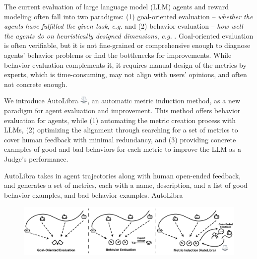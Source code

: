 \documentclass{article} %
\begin{document}
The current evaluation of large language model (LLM) agents and reward modeling often fall
into two paradigms: (1) goal-oriented evaluation --
\emph{whether the agents have fulfilled the given task},
\emph{e.g.} \citet{zhouwebarena,jimenezswe,chan2024mle,paglieri2024balrog}
and (2) behavior evaluation -- \emph{how well the agents do on heuristically designed dimensions},
\emph{e.g.} \citet{zhousotopia,shao2024collaborative,pan2025why}. 
Goal-oriented evaluation is often verifiable, but it is not fine-grained or comprehensive enough
to diagnose agents' behavior problems or find the bottlenecks for improvements. 
While behavior evaluation complements it, it requires manual design of the metrics by experts,
which is time-consuming, may not align with users' opinions, and often not concrete enough. 

We introduce AutoLibra \protect\includegraphics[height=1em]{figs/scale.png}, an automatic metric induction method,
as a new paradigm for agent evaluation and improvement.
This method offers behavior evaluation for agents, while (1) automating the metric creation process with LLMs, 
(2) optimizing the alignment through searching for a set of metrics to cover human feedback with minimal redundancy,
and (3) providing concrete examples of good and bad behaviors for each metric to improve the
LLM-as-a-Judge's performance. 

AutoLibra takes in agent trajectories along with human open-ended feedback, and generates a set of metrics, each with a name, description, and a list of good behavior examples, and bad behavior examples. AutoLibra 

\begin{figure}
\centering
\includegraphics[width=\textwidth]{figs/autolibra.pdf}
\end{figure}
\end{document}
